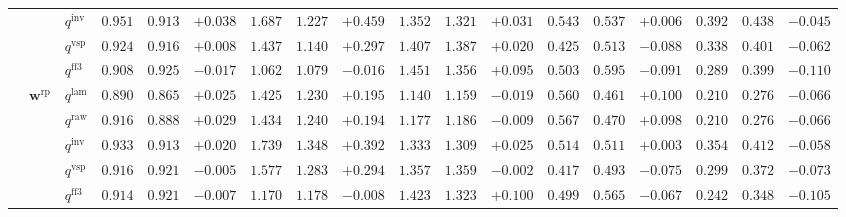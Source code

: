 \documentclass{article}
\begin{document}
\begin{table}[!htbp]
{\begin{tabular}{lll ccc ccc ccc ccc ccc}
 &  & $q^{\mathrm{inv}}$ & $0.951$ & $0.913$ & \cellcolor{posgreen!50}$+0.038$ & $1.687$ & $1.227$ & \cellcolor{posgreen!50}$+0.459$ & $1.352$ & $1.321$ & \cellcolor{posgreen!50}$+0.031$ & $0.543$ & $0.537$ & \cellcolor{posgreen!50}$+0.006$ & $0.392$ & $0.438$ & \cellcolor{negred!50}$-0.045$ \\
 &  & $q^{\mathrm{vsp}}$ & $0.924$ & $0.916$ & \cellcolor{posgreen!50}$+0.008$ & $1.437$ & $1.140$ & \cellcolor{posgreen!50}$+0.297$ & $1.407$ & $1.387$ & \cellcolor{posgreen!50}$+0.020$ & $0.425$ & $0.513$ & \cellcolor{negred!50}$-0.088$ & $0.338$ & $0.401$ & \cellcolor{negred!50}$-0.062$ \\
 &  & $q^{\mathrm{ff3}}$ & $0.908$ & $0.925$ & \cellcolor{negred!50}$-0.017$ & $1.062$ & $1.079$ & \cellcolor{negred!50}$-0.016$ & $1.451$ & $1.356$ & \cellcolor{posgreen!50}$+0.095$ & $0.503$ & $0.595$ & \cellcolor{negred!50}$-0.091$ & $0.289$ & $0.399$ & \cellcolor{negred!50}$-0.110$ \\
\cmidrule(lr){2-18}
 & $\mathbf{w}^{\mathrm{rp}}$ & $q^{\mathrm{lam}}$ & $0.890$ & $0.865$ & \cellcolor{posgreen!50}$+0.025$ & $1.425$ & $1.230$ & \cellcolor{posgreen!50}$+0.195$ & $1.140$ & $1.159$ & \cellcolor{negred!50}$-0.019$ & $0.560$ & $0.461$ & \cellcolor{posgreen!50}$+0.100$ & $0.210$ & $0.276$ & \cellcolor{negred!50}$-0.066$ \\
 &  & $q^{\mathrm{raw}}$ & $0.916$ & $0.888$ & \cellcolor{posgreen!50}$+0.029$ & $1.434$ & $1.240$ & \cellcolor{posgreen!50}$+0.194$ & $1.177$ & $1.186$ & \cellcolor{negred!50}$-0.009$ & $0.567$ & $0.470$ & \cellcolor{posgreen!50}$+0.098$ & $0.210$ & $0.276$ & \cellcolor{negred!50}$-0.066$ \\
 &  & $q^{\mathrm{inv}}$ & $0.933$ & $0.913$ & \cellcolor{posgreen!50}$+0.020$ & $1.739$ & $1.348$ & \cellcolor{posgreen!50}$+0.392$ & $1.333$ & $1.309$ & \cellcolor{posgreen!50}$+0.025$ & $0.514$ & $0.511$ & \cellcolor{posgreen!50}$+0.003$ & $0.354$ & $0.412$ & \cellcolor{negred!50}$-0.058$ \\
 &  & $q^{\mathrm{vsp}}$ & $0.916$ & $0.921$ & \cellcolor{negred!50}$-0.005$ & $1.577$ & $1.283$ & \cellcolor{posgreen!50}$+0.294$ & $1.357$ & $1.359$ & \cellcolor{negred!50}$-0.002$ & $0.417$ & $0.493$ & \cellcolor{negred!50}$-0.075$ & $0.299$ & $0.372$ & \cellcolor{negred!50}$-0.073$ \\
 &  & $q^{\mathrm{ff3}}$ & $0.914$ & $0.921$ & \cellcolor{negred!50}$-0.007$ & $1.170$ & $1.178$ & \cellcolor{negred!50}$-0.008$ & $1.423$ & $1.323$ & \cellcolor{posgreen!50}$+0.100$ & $0.499$ & $0.565$ & \cellcolor{negred!50}$-0.067$ & $0.242$ & $0.348$ & \cellcolor{negred!50}$-0.105$ \\
\bottomrule
\end{tabular}}
\end{table}
\end{document}
